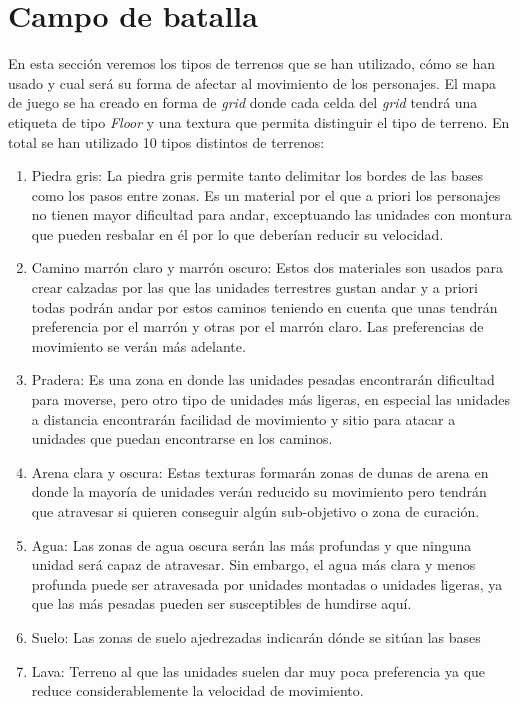 \section{Campo de batalla}

En esta sección veremos los tipos de terrenos que se han utilizado, cómo se han usado y cual será su forma de afectar al movimiento de los personajes. El mapa de juego se ha creado en forma de \textit{grid} donde cada celda del \textit{grid} tendrá una etiqueta de tipo \textit{Floor} y una textura que permita distinguir el tipo de terreno. En total se han utilizado 10 tipos distintos de terrenos:

\begin{enumerate}
    \item Piedra gris: La piedra gris permite tanto delimitar los bordes de las bases como los pasos entre zonas. Es un material por el que a priori los personajes no tienen mayor dificultad para andar, exceptuando las unidades con montura que pueden resbalar en él por lo que deberían reducir su velocidad.  
    \item Camino marrón claro y marrón oscuro: Estos dos materiales son usados para crear calzadas por las que las unidades terrestres gustan andar y a priori todas podrán andar por estos caminos teniendo en cuenta que unas tendrán preferencia por el marrón y otras por el marrón claro. Las preferencias de movimiento se verán más adelante.
    \item Pradera: Es una zona en donde las unidades pesadas encontrarán dificultad para moverse, pero otro tipo de unidades más ligeras, en especial las unidades a distancia encontrarán facilidad de movimiento y sitio para atacar a unidades que puedan encontrarse en los caminos.
    \item Arena clara y oscura: Estas texturas formarán zonas de dunas de arena en donde la mayoría de unidades verán reducido su movimiento pero tendrán que atravesar si quieren conseguir algún sub-objetivo o zona de curación. 
    \item Agua: Las zonas de agua oscura serán las más profundas y que ninguna unidad será capaz de atravesar. Sin embargo, el agua más clara y menos profunda puede ser atravesada por unidades montadas o unidades ligeras, ya que las más pesadas pueden ser susceptibles de hundirse aquí.
    \item Suelo: Las zonas de suelo ajedrezadas indicarán dónde se sitúan las bases  
    \item Lava: Terreno al que las unidades suelen dar muy poca preferencia ya que reduce considerablemente la velocidad de movimiento.
\end{enumerate}

